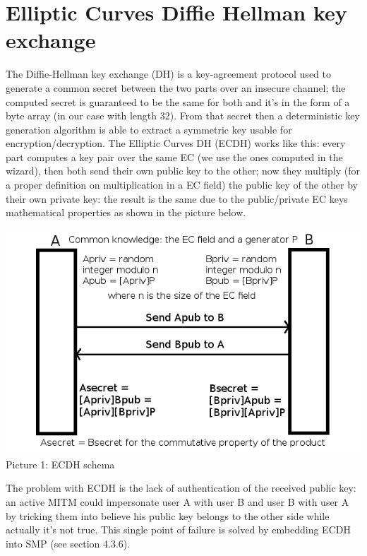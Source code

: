 \section{Elliptic Curves Diffie Hellman key exchange}
The Diffie-Hellman key exchange (DH) is a key-agreement protocol used to generate a common secret between the two parts over an insecure channel; the computed secret is guaranteed to be the same for both and it's in the form of a byte array (in our case with length 32). From that secret then a deterministic key generation algorithm is able to extract a symmetric key usable for encryption/decryption. The Elliptic Curves DH (ECDH) works like this: every part computes a key pair over the same EC (we use the ones computed in the wizard), then both send their own public key to the other; now they multiply (for a proper definition on multiplication in a EC field) the public key of the other by their own private key: the result is the same due to the public/private EC keys mathematical properties as shown in the picture below.\\

\vspace{1cm}
\begin{center}
\includegraphics[scale=0.7]{images/ecdh}\\

\vspace{1cm}
Picture 1: ECDH schema\\
\end{center}

\vspace{1cm}
The problem with ECDH is the lack of authentication of the received public key: an active MITM could impersonate user A with user B and user B with user A by tricking them into believe his public key belongs to the other side while actually it's not true. This single point of failure is solved by embedding ECDH into SMP (see section 4.3.6).